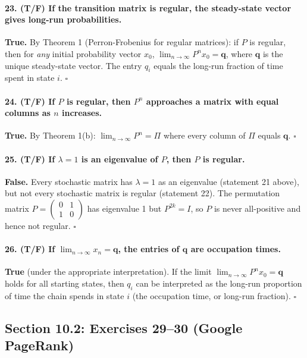 \documentclass[11pt,a4paper]{article}
\theoremstyle{sol}
\begin{document}
\paragraph{23. (T/F) If the transition matrix is regular, the steady-state vector gives long-run probabilities.}
\textbf{True.} By Theorem 1 (Perron-Frobenius for regular matrices): if $P$ is regular, then for \emph{any} initial probability vector $x_0$, $\lim_{n\to\infty}P^n x_0=\mathbf{q}$, where $\mathbf{q}$ is the unique steady-state vector. The entry $q_i$ equals the long-run fraction of time spent in state $i$. $\square$

\paragraph{24. (T/F) If $P$ is regular, then $P^n$ approaches a matrix with equal columns as $n$ increases.}
\textbf{True.} By Theorem 1(b): $\lim_{n\to\infty}P^n=\Pi$ where every column of $\Pi$ equals $\mathbf{q}$. $\square$

\paragraph{25. (T/F) If $\lambda=1$ is an eigenvalue of $P$, then $P$ is regular.}
\textbf{False.} Every stochastic matrix has $\lambda=1$ as an eigenvalue (statement 21 above), but not every stochastic matrix is regular (statement 22). The permutation matrix $P=\begin{pmatrix}0&1\\1&0\end{pmatrix}$ has eigenvalue 1 but $P^{2k}=I$, so $P$ is never all-positive and hence not regular. $\square$

\paragraph{26. (T/F) If $\lim_{n\to\infty}x_n=\mathbf{q}$, the entries of $\mathbf{q}$ are occupation times.}
\textbf{True} (under the appropriate interpretation). If the limit $\lim_{n\to\infty}P^n x_0=\mathbf{q}$ holds for all starting states, then $q_i$ can be interpreted as the long-run proportion of time the chain spends in state $i$ (the occupation time, or long-run fraction). $\square$

\clearpage
\subsection{Section 10.2: Exercises 29--30 (Google PageRank)}
\end{document}

